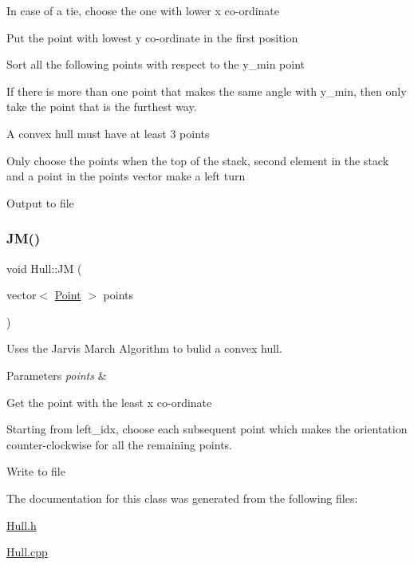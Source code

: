 In case of a tie, choose the one with lower x co-\/ordinate

Put the point with lowest y co-\/ordinate in the first position

Sort all the following points with respect to the y\+\_\+min point

If there is more than one point that makes the same angle with y\+\_\+min, then only take the point that is the furthest way.

A convex hull must have at least 3 points

Only choose the points when the top of the stack, second element in the stack and a point in the points vector make a left turn

Output to file\mbox{\label{classHull_ac157f37a1bb8197570e16ad151d39f11}} 
\subsubsection{\texorpdfstring{J\+M()}{JM()}}
{\footnotesize\ttfamily void Hull\+::\+JM (\begin{DoxyParamCaption}\item[{vector$<$ \hyperlink{classPoint}{Point} $>$}]{points }\end{DoxyParamCaption})}



Uses the Jarvis March Algorithm to bulid a convex hull. 


\begin{DoxyParams}{Parameters}
{\em points} & \\
\hline
\end{DoxyParams}
Get the point with the least x co-\/ordinate

Starting from left\+\_\+idx, choose each subsequent point which makes the orientation counter-\/clockwise for all the remaining points.

Write to file

The documentation for this class was generated from the following files\+:\begin{DoxyCompactItemize}
\item 
\hyperlink{Hull_8h}{Hull.\+h}\item 
\hyperlink{Hull_8cpp}{Hull.\+cpp}\end{DoxyCompactItemize}
